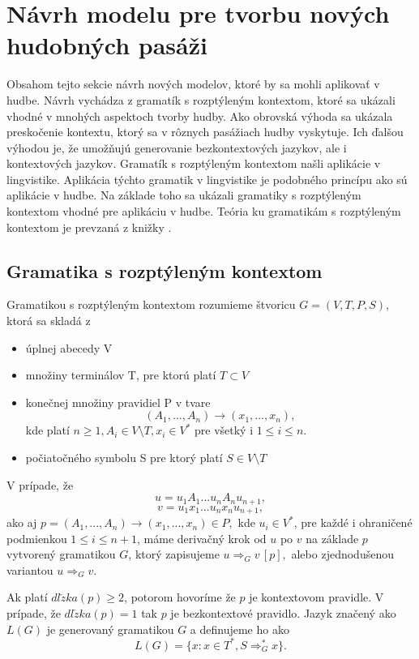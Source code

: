 \chapter{Návrh modelu pre tvorbu nových hudobných pasáži}
\label{chap:app}
Obsahom tejto sekcie návrh nových modelov, ktoré by sa mohli aplikovať v hudbe. Návrh vychádza z gramatík s rozptýleným kontextom, ktoré sa ukázali vhodné v mnohých aspektoch tvorby hudby. Ako obrovská výhoda sa ukázala preskočenie kontextu, ktorý sa v rôznych pasážiach hudby vyskytuje. Ich ďalšou výhodou je, že umožňujú generovanie bezkontextových jazykov, ale i kontextových jazykov. Gramatík s rozptýleným kontextom našli aplikácie v lingvistike. Aplikácia týchto gramatik v lingvistike je podobného princípu ako sú aplikácie v hudbe. Na základe toho sa ukázali gramatiky s rozptýleným kontextom vhodné pre aplikáciu v hudbe. Teória ku gramatikám s rozptýleným kontextom je prevzaná z knižky \cite{FITPUB8997}.

\section{Gramatika s rozptýleným kontextom}
\begin{definition}
Gramatikou s rozptýleným kontextom rozumieme štvoricu $G = (V,T,P,S)$, ktorá sa skladá z
\begin{itemize}\itemsep0.05em
    \item úplnej abecedy V 
    \item množiny terminálov T, pre ktorú platí $T \subset V$
    \item konečnej množiny pravidiel P v tvare $$(A_1, ..., A_n) \rightarrow (x_1, ..., x_n),$$ kde platí $n \geq 1, A_i \in V \setminus T, x_i \in V^*$ pre všetký i $1 \leq i \leq n.$
    \item počiatočného symbolu S pre ktorý platí $S \in V \setminus T$
\end{itemize}
\end{definition}

V prípade, že $$u = u_1A_1...u_nA_nu_{n+1},$$$$v = u_1x_1...u_nx_nu_{n+1},$$ ako aj $p = (A_1, ..., A_n) \rightarrow (x_1, ..., x_n) \in P,$ kde $u_i \in V^*$, pre každé i ohraničené podmienkou $1 \leq i \leq n + 1$, máme derivačný krok od $u$ po $v$ na základe $p$ vytvorený gramatikou $G$, ktorý zapisujeme $u \Rightarrow_G v \, [p],$ alebo zjednodušenou variantou $u \Rightarrow_G v$.

Ak platí $dl\check{z}ka(p) \geq 2$, potorom hovoríme že $p$ je kontextovom pravidle. V prípade, že $dl\check{z}ka(p) = 1$ tak $p$ je bezkontextové pravidlo. Jazyk značený ako $L(G)$ je generovaný gramatikou $G$ a definujeme ho ako $$L(G) = \{x: x \in T^*, S \Rightarrow^*_G x\}.$$

